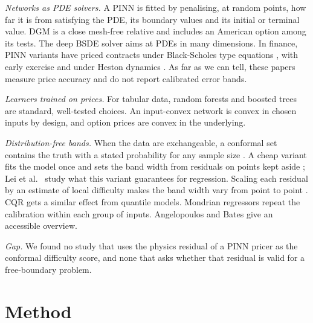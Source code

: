 \documentclass[conference]{IEEEtran}
\begin{document}
\emph{Networks as PDE solvers.} A PINN \cite{raissi2019physics} is fitted by penalising, at random points, how far it is from satisfying the PDE, its boundary values and its initial or terminal value. DGM \cite{sirignano2018dgm} is a close mesh-free relative and includes an American option among its tests. The deep BSDE solver \cite{han2018solving} aims at PDEs in many dimensions. In finance, PINN variants have priced contracts under Black-Scholes type equations \cite{bai2022application}, with early exercise \cite{gatta2023meshless} and under Heston dynamics \cite{hainaut2024option}. As far as we can tell, these papers measure price accuracy and do not report calibrated error bands.

\emph{Learners trained on prices.} For tabular data, random forests \cite{ho1995random,breiman2001random} and boosted trees \cite{friedman2001greedy} are standard, well-tested choices. An input-convex network \cite{amos2017input} is convex in chosen inputs by design, and option prices are convex in the underlying.

\emph{Distribution-free bands.} When the data are exchangeable, a conformal set contains the truth with a stated probability for any sample size \cite{vovk2005algorithmic}. A cheap variant fits the model once and sets the band width from residuals on points kept aside \cite{papadopoulos2002inductive}; Lei et al.~\cite{lei2018distribution} study what this variant guarantees for regression. Scaling each residual by an estimate of local difficulty makes the band width vary from point to point \cite{papadopoulos2011regression}. CQR \cite{romano2019conformalized} gets a similar effect from quantile models. Mondrian regressors \cite{bostrom2020mondrian} repeat the calibration within each group of inputs. Angelopoulos and Bates \cite{angelopoulos2023conformal} give an accessible overview.

\emph{Gap.} We found no study that uses the physics residual of a PINN pricer as the conformal difficulty score, and none that asks whether that residual is valid for a free-boundary problem.

\section{Method}
\end{document}
